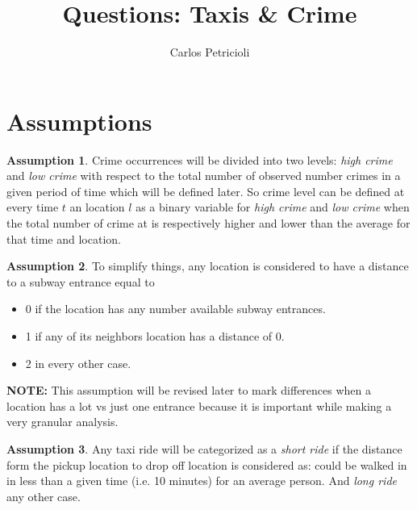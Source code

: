 \documentclass[12pt,letterpaper,english]{article}
\title{Questions: Taxis \& Crime}
\author{Carlos Petricioli}
\date{}
\theoremstyle{definition}
\newtheorem{assumption}{Assumption}[section]
\begin{document}
\maketitle

\section{Assumptions}

\begin{assumption}
Crime occurrences will be divided into  two levels: \textit{high crime} and  \textit{low crime} with respect to the total number of observed number crimes in a given period of time which will be defined later.
So crime level can be defined at every time $t$ an location $l$ as a binary variable for \textit{high crime} and \textit{low crime} when the total number of crime at is respectively higher and lower  than the average for that time and location.
\end{assumption}

\begin{assumption}
To simplify things, any location is considered to have a  distance to a subway entrance equal to 

\begin{itemize}
\item  0 if the location has any number available subway entrances.
\item  1 if any of its neighbors location has a distance of 0. 
\item  2 in every other case.
\end{itemize}
\textbf{NOTE:} This assumption will be revised later to mark differences when a location has a lot vs just one entrance because it is important while making a very granular analysis.
\end{assumption}

\begin{assumption}
Any taxi ride will be categorized as a \textit{short ride} if the distance form the pickup location to drop off location is considered as: could be walked in in less than a given time (i.e. 10 minutes) for an average person. And \textit{long ride} any other case.
\end{assumption}
\end{document}
